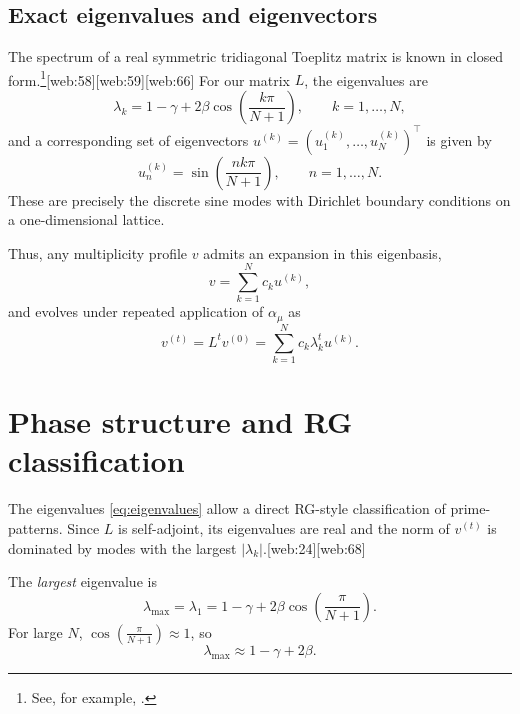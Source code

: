 \documentclass[11pt]{article}
\begin{document}
\subsection{Exact eigenvalues and eigenvectors}

The spectrum of a real symmetric tridiagonal Toeplitz matrix is known in closed form.\footnote{See, for example, \cite{ToeplitzTridiagonal,ToeplitzProperties,ToeplitzEigen}.}[web:58][web:59][web:66]
For our matrix $L$, the eigenvalues are
\begin{equation}
    \lambda_k = 1 - \gamma + 2\beta \cos\left(\frac{k\pi}{N+1}\right), 
    \qquad k = 1,\dots,N,
    \label{eq:eigenvalues}
\end{equation}
and a corresponding set of eigenvectors $u^{(k)} = (u^{(k)}_1,\dots,u^{(k)}_N)^\top$ is given by
\begin{equation}
    u^{(k)}_n = \sin\left(\frac{nk\pi}{N+1}\right), \qquad n = 1,\dots,N.
    \label{eq:eigenvectors}
\end{equation}
These are precisely the discrete sine modes with Dirichlet boundary conditions on a one-dimensional lattice.

Thus, any multiplicity profile $v$ admits an expansion in this eigenbasis,
\begin{equation}
    v = \sum_{k=1}^N c_k u^{(k)},
\end{equation}
and evolves under repeated application of $\alpha_\mu$ as
\begin{equation}
    v^{(t)} = L^t v^{(0)} = \sum_{k=1}^N c_k \lambda_k^t u^{(k)}.
\end{equation}


\section{Phase structure and RG classification}

The eigenvalues \eqref{eq:eigenvalues} allow a direct RG-style classification of prime-patterns.
Since $L$ is self-adjoint, its eigenvalues are real and the norm of $v^{(t)}$ is dominated by modes with the largest $|\lambda_k|$.[web:24][web:68]

The \emph{largest} eigenvalue is
\begin{equation}
    \lambda_{\max} = \lambda_1 
    = 1 - \gamma + 2\beta \cos\left(\frac{\pi}{N+1}\right).
\end{equation}
For large $N$, $\cos\left(\frac{\pi}{N+1}\right) \approx 1$, so
\begin{equation}
    \lambda_{\max} \approx 1 - \gamma + 2\beta.
\end{equation}
\end{document}
